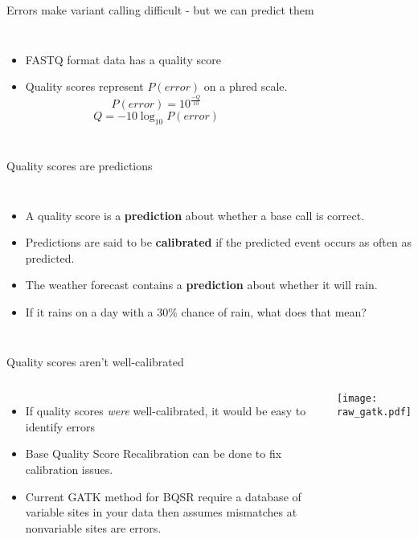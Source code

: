 \documentclass{beamer}
\begin{document}
\begin{frame}{Errors make variant calling difficult - but we can predict them}

\begin{columns}
	\begin{itemize}
		\item FASTQ format data has a quality score
		\item Quality scores represent $P(error)$ on a phred scale.
		\begin{displaymath}
		P(error) = 10^{\frac{-Q}{10}}
		\end{displaymath}
		\begin{displaymath}
		Q = -10\log_{10}{P(error)}
		\end{displaymath}
	\end{itemize}
\end{columns}

\end{frame}

\begin{frame}{Quality scores are predictions}
\begin{columns}
\begin{itemize}
\item A quality score is a \textbf{prediction} about whether a base call is correct.
\item Predictions are said to be \textbf{calibrated} if the predicted event occurs as often as predicted.
\item The weather forecast contains a \textbf{prediction} about whether it will rain.
\item If it rains on a day with a 30\% chance of rain, what does that mean?
\end{itemize}
\end{columns}
\end{frame}

\begin{frame}{Quality scores aren't well-calibrated}
\begin{columns}
\begin{itemize}
\item If quality scores \textit{were} well-calibrated, it would be easy to identify errors
\item Base Quality Score Recalibration can be done to fix calibration issues.
\item Current GATK method for BQSR require a database of variable sites in your data
then assumes mismatches at nonvariable sites are errors.
\end{itemize}
\texttt{[image: raw\_gatk.pdf]}
\end{columns}
\end{frame}
\end{document}
